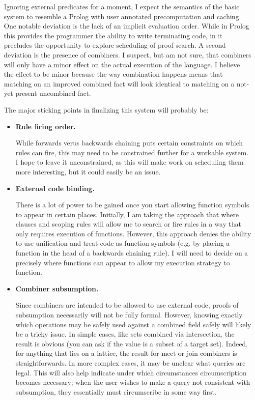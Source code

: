 Ignoring external predicates for a moment, I expect the semantics of the basic system to resemble a Prolog with user annotated precomputation and caching.
One notable deviation is the lack of an implicit evaluation order.
While in Prolog this provides the programmer the ability to write terminating code, in \sysname it precludes the opportunity to explore scheduling of proof search.
A second deviation is the presence of combiners.
I suspect, but am not sure, that combiners will only have a minor effect on the actual execution of the language.
I believe the effect to be minor because the way combination happens means that matching on an improved combined fact will look identical to matching on a not-yet present uncombined fact.

The major sticking points in finalizing this system will probably be:
\begin{itemize}
\item {\bf Rule firing order.}

While forwards verus backwards chaining puts certain constraints on which rules can fire, this may need to be constrained further for a workable system.
I hope to leave it unconstrained, as this will make work on scheduling them more interesting, but it could easily be an issue.

\item {\bf External code binding.}

There is a lot of power to be gained once you start allowing function symbols to appear in certain places.
Initially, I am taking the approach that where clauses and scoping rules will allow me to search or fire rules in a way that only requires execution of functions.
However, this approach denies the ability to use unification and treat code as function symbols (e.g. by placing a function in the head of a backwards chaining rule).
I will need to decide on a precisely where functions can appear to allow my execution strategy to function.

\item {\bf Combiner subsumption.}

Since combiners are intended to be allowed to use external code, proofs of subsumption necessarily will not be fully formal.
However, knowing exactly which operations may be safely used against a combined field safely will likely be a tricky issue.
In simple cases, like sets combined via intersection, the result is obvious (you can ask if the value is a subset of a target set).
Indeed, for anything that lies on a lattice, the result for meet or join combiners is straightforwards.
In more complex cases, it may be unclear what queries are legal.
This will also help indicate under which circumstances circumscription becomes necessary;
when the user wishes to make a query not consistent with subsumption, they essentially must circumscribe in some way first.
\end{itemize}

